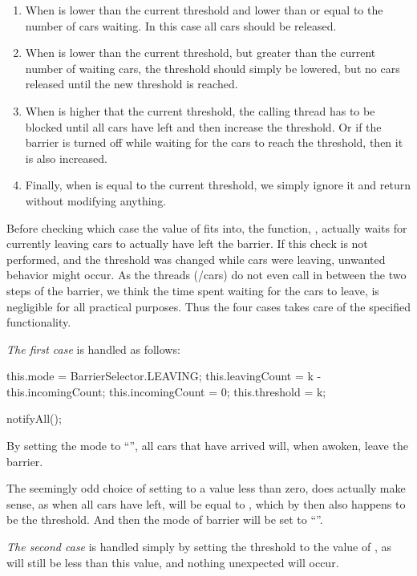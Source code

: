 \begin{enumerate}
\item When  is lower than the current threshold and lower than
  or equal to the number of cars waiting. In this case all cars should
  be released.
\item When  is lower than the current threshold, but greater
  than the current number of waiting cars, the threshold should simply
  be lowered, but no cars released until the new threshold is reached.
\item When  is higher that the current threshold, the calling
  thread has to be blocked until all cars have left and then increase
  the threshold. Or if the barrier is turned off while waiting for the
  cars to reach the threshold, then it is also increased.
\item Finally, when  is equal to the current threshold, we
  simply ignore it and return without modifying anything.
\end{enumerate}

Before checking which case the value of  fits into, the
function, , actually waits for currently leaving
cars to actually have left the barrier. If this check is not
performed, and the threshold was changed while cars were leaving,
unwanted behavior might occur. As the threads (/cars) do not even call
 in between the two steps of the barrier, we think the
time spent waiting for the cars to leave, is negligible for all
practical purposes. Thus the four cases takes care of the specified
functionality.

\emph{The first case} is handled as follows:
\begin{java}
this.mode = BarrierSelector.LEAVING;
this.leavingCount = k - this.incomingCount;
this.incomingCount = 0;
this.threshold = k;

notifyAll();
\end{java}

By setting the mode to ``'', all cars that have arrived
will, when awoken, leave the barrier.

The seemingly odd choice of setting  to a value
less than zero, does actually make sense, as when all cars have left,
 will be equal to , which by then also
happens to be the threshold. And then the mode of barrier will be set
to ``''.

\emph{The second case} is handled simply by setting the threshold to
the value of , as  will still be less than
this value, and nothing unexpected will occur.


